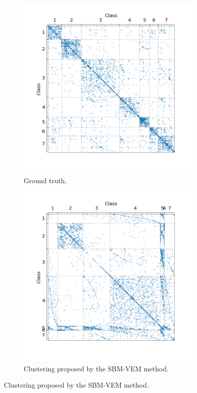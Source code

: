 \documentclass[switch, 12pt]{article}
\begin{document}
\begin{figure}[H]
    \centering
    \hfill
    \begin{subfigure}{0.45\linewidth}
        \centering
        \includegraphics[width=\linewidth, trim={45 35 35 40}, clip]{figures/cora_gt.png}
        \caption{Ground truth.}
        \label{fig:cora_gt}
    \end{subfigure}
    \hfill
    \begin{subfigure}{0.45\linewidth}
        \centering
        \includegraphics[width=\linewidth, trim={45 35 35 40}, clip]{figures/cora_SBM.png}
        \caption{Clustering proposed by the SBM-VEM method.}
        \label{fig:cora_SBM}
    \end{subfigure}
    \hfill


\end{figure}
\end{document}
